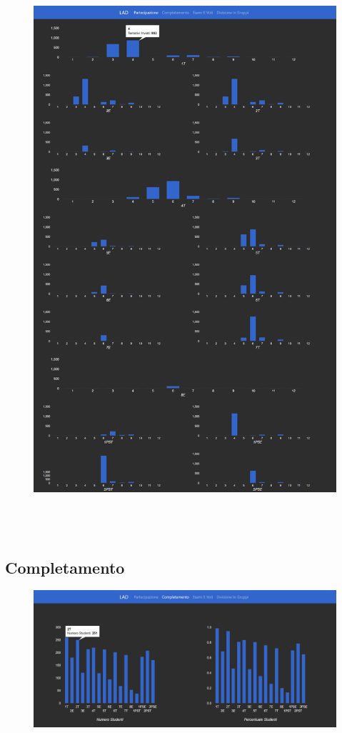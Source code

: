 \begin{figure}[H]
	\centering
	\includegraphics[width=160mm,height= 210mm]{../Immagini/5}
\end{figure}

\subsection{Completamento}

\begin{figure}[H]
	\centering
	\includegraphics[width=160mm]{../Immagini/6}
\end{figure}

